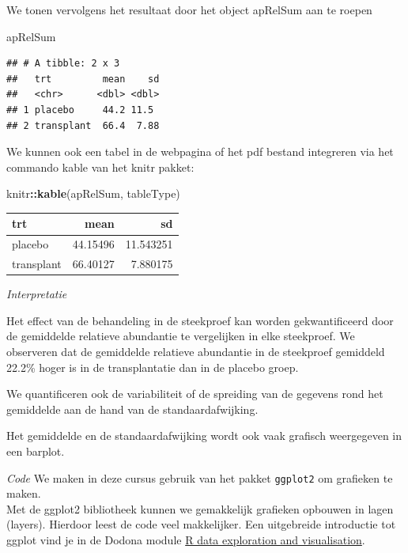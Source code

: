 \documentclass[
  12pt,dutch]{book}
\newenvironment{Shaded}{\begin{snugshade}}{\end{snugshade}}
\newcommand{\FunctionTok}[1]{\textcolor[rgb]{0.13,0.29,0.53}{\textbf{#1}}}
\newcommand{\NormalTok}[1]{#1}
\newcommand{\SpecialCharTok}[1]{\textcolor[rgb]{0.81,0.36,0.00}{\textbf{#1}}}
\theoremstyle{definition}
\theoremstyle{definition}
\theoremstyle{definition}
\theoremstyle{definition}
\theoremstyle{remark}
\begin{document}
We tonen vervolgens het resultaat door het object apRelSum aan te roepen

\begin{Shaded}
\begin{Highlighting}[]
\NormalTok{apRelSum}
\end{Highlighting}
\end{Shaded}

\begin{verbatim}
## # A tibble: 2 x 3
##   trt         mean    sd
##   <chr>      <dbl> <dbl>
## 1 placebo     44.2 11.5 
## 2 transplant  66.4  7.88
\end{verbatim}

We kunnen ook een tabel in de webpagina of het pdf bestand integreren via het commando kable van het knitr pakket:

\begin{Shaded}
\begin{Highlighting}[]
\NormalTok{knitr}\SpecialCharTok{::}\FunctionTok{kable}\NormalTok{(apRelSum, tableType)}
\end{Highlighting}
\end{Shaded}

\begin{tabular}{l|r|r}
\hline
trt & mean & sd\\
\hline
placebo & 44.15496 & 11.543251\\
\hline
transplant & 66.40127 & 7.880175\\
\hline
\end{tabular}

\emph{Interpretatie}

Het effect van de behandeling in de steekproef kan worden gekwantificeerd door de gemiddelde relatieve abundantie te vergelijken in elke steekproef. We observeren dat de gemiddelde relatieve abundantie in de steekproef gemiddeld 22.2\% hoger is in de transplantatie dan in de placebo groep.

We quantificeren ook de variabiliteit of de spreiding van de gegevens rond het gemiddelde aan de hand van de standaardafwijking.

Het gemiddelde en de standaardafwijking wordt ook vaak grafisch weergegeven in een barplot.

\emph{Code}
We maken in deze cursus gebruik van het pakket \texttt{ggplot2} om grafieken te maken.\\
Met de ggplot2 bibliotheek kunnen we gemakkelijk grafieken opbouwen in lagen (layers).
Hierdoor leest de code veel makkelijker.
Een uitgebreide introductie tot ggplot vind je in de Dodona module \href{https://dodona.ugent.be/nl/courses/345/}{R data exploration and visualisation}.
\end{document}

